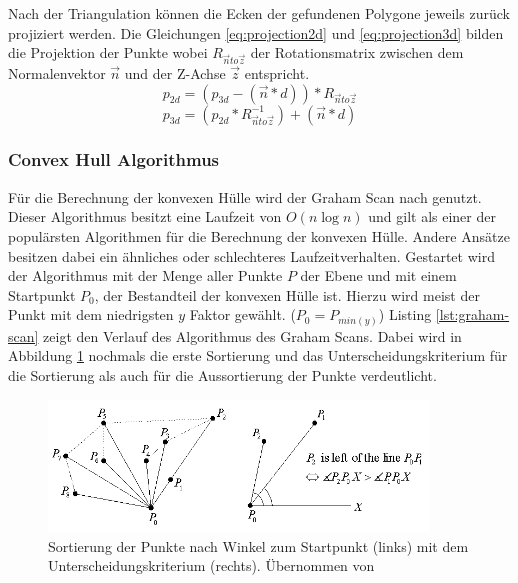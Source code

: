 Nach der Triangulation können die Ecken der gefundenen Polygone jeweils zurück projiziert werden. Die Gleichungen \ref{eq:projection2d} und \ref{eq:projection3d} bilden die Projektion der Punkte wobei \(R_{\vec{n}to\vec{z}}\) der Rotationsmatrix zwischen dem Normalenvektor \(\vec{n}\) und der Z-Achse \(\vec{z}\) entspricht.\\

\begin{equation} \label{eq:projection2d}
p_{2d} = (p_{3d} - (\vec{n}*d)) * R_{\vec{n}to\vec{z}}
\end{equation}
\begin{equation} \label{eq:projection3d}
p_{3d} = (p_{2d} * R_{\vec{n}to\vec{z}}^{-1}) + (\vec{n}*d)
\end{equation}

\subsubsection{Convex Hull Algorithmus}

Für die Berechnung der konvexen Hülle wird der Graham Scan nach \citet{graham1972efficient} genutzt. Dieser Algorithmus besitzt eine Laufzeit von \(O(n \log n)\) und gilt als einer der populärsten Algorithmen für die Berechnung der konvexen Hülle. Andere Ansätze besitzen dabei ein ähnliches oder schlechteres Laufzeitverhalten. Gestartet wird der Algorithmus mit der Menge aller Punkte \(P\) der Ebene und mit einem Startpunkt \(P_0\), der Bestandteil der konvexen Hülle ist. Hierzu wird meist der Punkt mit dem niedrigsten \(y\) Faktor gewählt. (\(P_0=P_{min(y)}\)) Listing \ref{lst:graham-scan} zeigt den Verlauf des Algorithmus des Graham Scans. Dabei wird in Abbildung \ref{fig:convexhull} nochmals die erste Sortierung und das Unterscheidungskriterium für die Sortierung als auch für die Aussortierung der Punkte verdeutlicht. \citep{convexHull} \\

\begin{figure}
  \centering
	\includegraphics[width=0.9\textwidth]{content/images/methods/convexhull.png} 
  \caption{Sortierung der Punkte nach Winkel zum Startpunkt (links) mit dem Unterscheidungskriterium (rechts). Übernommen von \citet{convexHull}}
  \label{fig:convexhull}
\end{figure}

